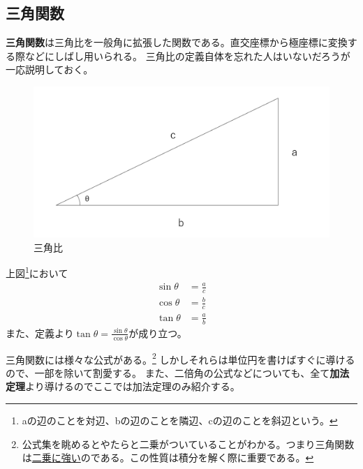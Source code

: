 \documentclass[a4j,dvipdfmx]{jsarticle}
\begin{document}
            \subsection{三角関数}
                \textbf{三角関数}は三角比を一般角に拡張した関数である。直交座標から極座標に変換する際などにしばし用いられる。
                三角比の定義自体を忘れた人はいないだろうが一応説明しておく。
                \begin{figure}[h]
                    \centering
                    \includegraphics[keepaspectratio,scale=0.3]{img/QuuNote/triangleFunc.png}
                    \caption{三角比}
                \end{figure}

                上図\footnote{aの辺のことを対辺、bの辺のことを隣辺、cの辺のことを斜辺という。}において
                \begin{align}
                    \sin \theta &= \frac{a}{c}\\
                    \cos \theta &= \frac{b}{c}\\
                    \tan \theta &= \frac{a}{b}
                \end{align}
                また、定義より$\displaystyle\tan \theta = \frac{\sin \theta}{\cos \theta}$が成り立つ。

                三角関数には様々な公式がある。\footnote{公式集を眺めるとやたらと二乗がついていることがわかる。つまり三角関数は\underline{二乗に強い}のである。この性質は積分を解く際に重要である。}
                しかしそれらは単位円を書けばすぐに導けるので、一部を除いて割愛する。
                また、二倍角の公式などについても、全て\textbf{加法定理}より導けるのでここでは加法定理のみ紹介する。
\end{document}
